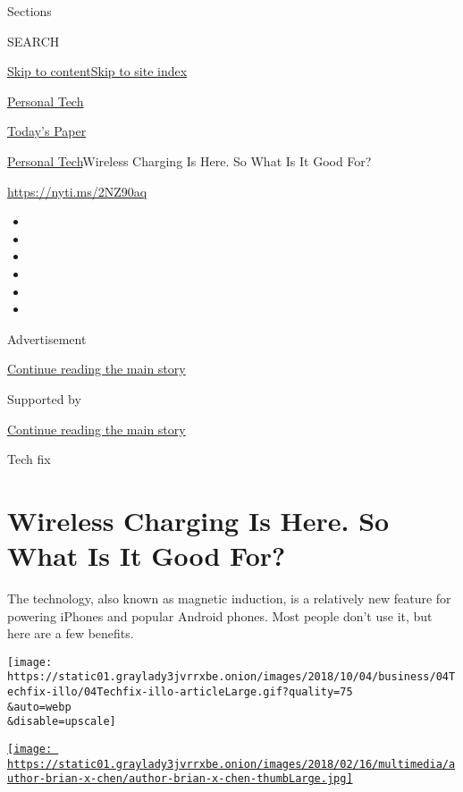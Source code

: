 Sections

SEARCH

\protect\hyperlink{site-content}{Skip to
content}\protect\hyperlink{site-index}{Skip to site index}

\href{https://www.nytimes3xbfgragh.onion/section/technology/personaltech}{Personal
Tech}

\href{https://myaccount.nytimes3xbfgragh.onion/auth/login?response_type=cookie\&client_id=vi}{}

\href{https://www.nytimes3xbfgragh.onion/section/todayspaper}{Today's
Paper}

\href{/section/technology/personaltech}{Personal Tech}\textbar{}Wireless
Charging Is Here. So What Is It Good For?

\href{https://nyti.ms/2NZ90aq}{https://nyti.ms/2NZ90aq}

\begin{itemize}
\item
\item
\item
\item
\item
\item
\end{itemize}

Advertisement

\protect\hyperlink{after-top}{Continue reading the main story}

Supported by

\protect\hyperlink{after-sponsor}{Continue reading the main story}

Tech fix

\hypertarget{wireless-charging-is-here-so-what-is-it-good-for}{%
\section{Wireless Charging Is Here. So What Is It Good
For?}\label{wireless-charging-is-here-so-what-is-it-good-for}}

The technology, also known as magnetic induction, is a relatively new
feature for powering iPhones and popular Android phones. Most people
don't use it, but here are a few benefits.

\texttt{[image: https://static01.graylady3jvrrxbe.onion/images/2018/10/04/business/04Techfix-illo/04Techfix-illo-articleLarge.gif?quality=75\\\&auto=webp\\\&disable=upscale]}

\href{https://www.nytimes3xbfgragh.onion/by/brian-x-chen}{\texttt{[image: https://static01.graylady3jvrrxbe.onion/images/2018/02/16/multimedia/author-brian-x-chen/author-brian-x-chen-thumbLarge.jpg]}}

